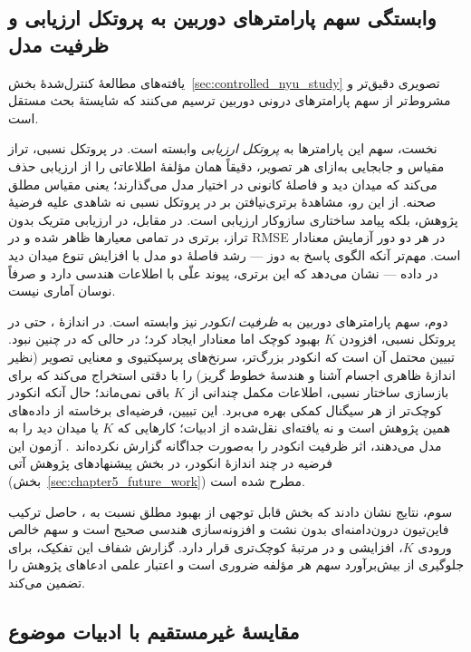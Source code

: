 \subsection{وابستگی سهم پارامترهای دوربین به پروتکل ارزیابی و ظرفیت مدل}
\label{subsec:protocol_capacity_dependence}

یافته‌های مطالعهٔ کنترل‌شدهٔ بخش~\ref{sec:controlled_nyu_study}
تصویری دقیق‌تر و مشروط‌تر از سهم پارامترهای درونی دوربین ترسیم می‌کنند
که شایستهٔ بحث مستقل است.

نخست، سهم این پارامترها به \emph{پروتکل ارزیابی} وابسته است.
در پروتکل نسبی، تراز مقیاس و جابجایی به‌ازای هر تصویر،
دقیقاً همان مؤلفهٔ اطلاعاتی را از ارزیابی حذف می‌کند
که میدان دید و فاصلهٔ کانونی در اختیار مدل می‌گذارند؛
یعنی مقیاس مطلق صحنه.
از این رو، مشاهدهٔ برتری‌نیافتن \proposedmodel{} بر \controlmodel{}
در پروتکل نسبی 
نه شاهدی علیه فرضیهٔ پژوهش،
بلکه پیامد ساختاری سازوکار ارزیابی است.
در مقابل، در ارزیابی متریک بدون تراز،
برتری \proposedmodel{} در تمامی معیارها ظاهر شده
و در RMSE در هر دو دور آزمایش معنادار است.
مهم‌تر آنکه الگوی پاسخ به دوز
--- رشد فاصلهٔ دو مدل با افزایش تنوع میدان دید در داده ---
نشان می‌دهد که این برتری، پیوند علّی با اطلاعات هندسی دارد
و صرفاً نوسان آماری نیست.

دوم، سهم پارامترهای دوربین به \emph{ظرفیت انکودر} نیز وابسته است.
در اندازهٔ ، حتی در پروتکل نسبی،
افزودن $K$ بهبود کوچک اما معنادار ایجاد کرد؛
در حالی که در  چنین نبود.
تبیین محتمل آن است که انکودر بزرگ‌تر،
سرنخ‌های پرسپکتیوی و معنایی تصویر
(نظیر اندازهٔ ظاهری اجسام آشنا و هندسهٔ خطوط گریز)
را با دقتی استخراج می‌کند که برای بازسازی ساختار نسبی،
اطلاعات مکمل چندانی از $K$ باقی نمی‌ماند؛
حال آنکه انکودر کوچک‌تر از هر سیگنال کمکی بهره می‌برد.
این تبیین، فرضیه‌ای برخاسته از داده‌های همین پژوهش است و نه یافته‌ای
نقل‌شده از ادبیات؛ کارهایی که $K$ یا میدان دید را به مدل می‌دهند،
اثر ظرفیت انکودر را به‌صورت جداگانه گزارش نکرده‌اند~\cite{Facil2019CAMConvs,Saxena2023FOV,Piccinelli2024UniDepth}.
آزمون این فرضیه در چند اندازهٔ انکودر، در بخش پیشنهادهای پژوهش آتی
(بخش~\ref{sec:chapter5_future_work}) مطرح شده است.

سوم، نتایج نشان دادند که بخش قابل توجهی از بهبود مطلق
نسبت به \publishedbasemodel{}،
حاصل ترکیب فاین‌تیون درون‌دامنه‌ای بدون نشت
و افزونه‌سازی هندسی صحیح است
و سهم خالص ورودی $K$، افزایشی و در مرتبهٔ کوچک‌تری قرار دارد.
گزارش شفاف این تفکیک،
برای جلوگیری از بیش‌برآورد سهم هر مؤلفه ضروری است
و اعتبار علمی ادعاهای پژوهش را تضمین می‌کند.

\subsection{مقایسهٔ غیرمستقیم با ادبیات موضوع}
\label{subsec:literature_comparison}

